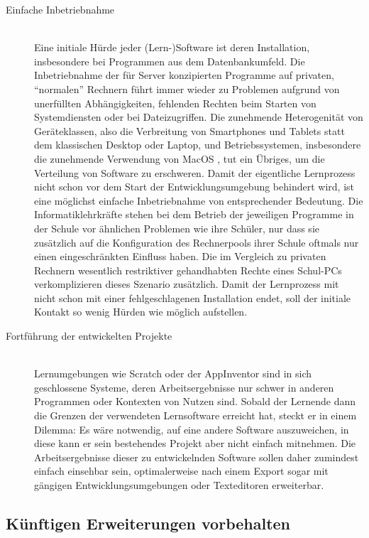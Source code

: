 \begin{description}
\item[Einfache Inbetriebnahme] \hfill \\
  Eine initiale Hürde jeder (Lern-)Software ist deren Installation, insbesondere bei Programmen aus dem Datenbankumfeld. Die Inbetriebnahme der für Server konzipierten Programme auf privaten, "`normalen"' Rechnern führt immer wieder zu Problemen aufgrund von unerfüllten Abhängigkeiten, fehlenden Rechten beim Starten von Systemdiensten oder bei Dateizugriffen. Die zunehmende Heterogenität von Geräteklassen, also die Verbreitung von Smartphones und Tablets statt dem klassischen Desktop oder Laptop, und Betriebssystemen, insbesondere die zunehmende Verwendung von MacOS \cite{statista-os-verbreitung}, tut ein Übriges, um die Verteilung von Software zu erschweren. Damit der eigentliche Lernprozess nicht schon vor dem Start der Entwicklungsumgebung behindert wird, ist eine möglichst einfache Inbetriebnahme von entsprechender Bedeutung. Die Informatiklehrkräfte stehen bei dem Betrieb der jeweiligen Programme in der Schule vor ähnlichen Problemen wie ihre Schüler, nur dass sie zusätzlich auf die Konfiguration des Rechnerpools ihrer Schule oftmals nur einen eingeschränkten Einfluss haben. Die im Vergleich zu privaten Rechnern wesentlich restriktiver gehandhabten Rechte eines Schul-PCs verkomplizieren dieses Szenario zusätzlich. Damit der Lernprozess mit \idename{} nicht schon mit einer fehlgeschlagenen Installation endet, soll der initiale Kontakt so wenig Hürden wie möglich aufstellen.
\item[Fortführung der entwickelten Projekte] \hfill \\
  Lernumgebungen wie Scratch oder der AppInventor sind in sich geschlossene Systeme, deren Arbeitsergebnisse nur schwer in anderen Programmen oder Kontexten von Nutzen sind. Sobald der Lernende dann die Grenzen der verwendeten Lernsoftware erreicht hat, steckt er in einem Dilemma: Es wäre notwendig, auf eine andere Software auszuweichen, in diese kann er sein bestehendes Projekt aber nicht einfach mitnehmen. Die Arbeitsergebnisse dieser zu entwickelnden Software sollen daher zumindest einfach einsehbar sein, optimalerweise nach einem Export sogar mit gängigen Entwicklungsumgebungen oder Texteditoren erweiterbar.
\end{description}

\subsection{Künftigen Erweiterungen vorbehalten}
\label{sec:out-of-scope}

